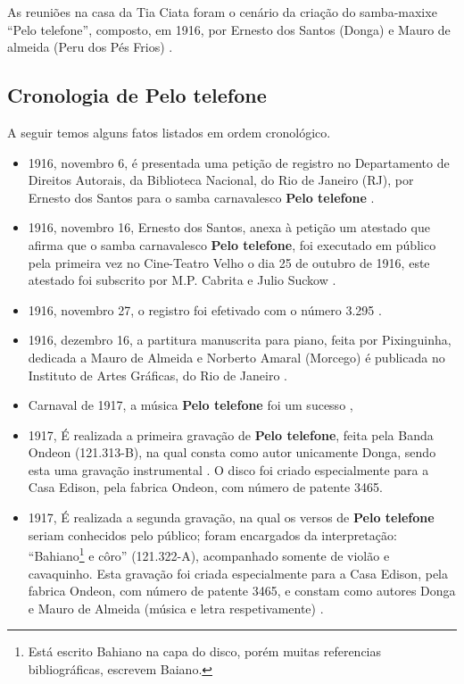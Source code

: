  As reuniões na casa da Tia Ciata foram o cenário da criação do samba-maxixe ``Pelo telefone'',
 composto, em 1916, 
por Ernesto dos Santos (Donga) e Mauro de almeida 
(Peru dos Pés Frios) \cite[pp. 34]{diniz2006almanaque} \cite[pp. 49]{diniz2008almanaque} 
\cite{musicapelotelefone} \cite[pp. 28]{diniz2003almanaque}.

\subsection{Cronologia de Pelo telefone}
A seguir temos alguns fatos listados em ordem cronológico.
\begin{itemize}
\item 1916, novembro 6, é presentada uma petição de registro no
Departamento de Direitos Autorais, da Biblioteca Nacional, 
do Rio de Janeiro (RJ), 
por   Ernesto dos Santos  para o samba carnavalesco \textbf{Pelo telefone} \cite[pp. 599]{marcondes1977enciclopediav2}.
\item 1916, novembro 16, Ernesto dos Santos, 
anexa à petição um atestado que afirma que 
o samba carnavalesco \textbf{Pelo telefone}, 
foi executado em público pela primeira vez no
Cine-Teatro Velho o dia 25 de outubro de 1916,
este atestado foi subscrito por M.P. Cabrita e Julio Suckow \cite[pp. 599]{marcondes1977enciclopediav2}.
\item 1916, novembro 27, o registro foi efetivado com o número 3.295 \cite[pp. 599]{marcondes1977enciclopediav2}.
\item 1916, dezembro 16, a partitura manuscrita para piano, feita por Pixinguinha, 
dedicada a Mauro de Almeida e Norberto Amaral (Morcego) é
publicada no Instituto de Artes Gráficas, do Rio de Janeiro \cite[pp. 599]{marcondes1977enciclopediav2} \cite[pp 1]{revistausp1}.
\item Carnaval de 1917, a música \textbf{Pelo telefone} foi um sucesso   \cite[pp. 599]{marcondes1977enciclopediav2}  \cite[pp. 35]{diniz2006almanaque}, 

\item 1917, É realizada a primeira gravação de  \textbf{Pelo telefone}, feita pela Banda Ondeon (121.313-B), 
na qual consta como autor unicamente Donga, 
sendo esta uma gravação instrumental \cite{musicapelotelefone} \cite[pp. 599]{marcondes1977enciclopediav2}.
O disco foi criado especialmente para a Casa Edison, pela fabrica Ondeon, com número de patente 3465.
\item 1917, É realizada a segunda gravação, na qual os versos de \textbf{Pelo telefone} seriam conhecidos pelo público;
foram encargados da interpretação: ``Bahiano\footnote{Está 
escrito Bahiano na capa do disco, porém muitas referencias bibliográficas,
escrevem Baiano.} e côro'' (121.322-A), acompanhado somente de violão e cavaquinho. 
Esta gravação foi criada especialmente para a Casa Edison, pela fabrica Ondeon, com número de patente 3465,  
e constam como autores Donga e Mauro de Almeida 
(música e letra respetivamente) \cite[pp. 599]{marcondes1977enciclopediav2} 
\cite[pp. 35]{diniz2006almanaque}  \cite{musicapelotelefone}.
\end{itemize}

